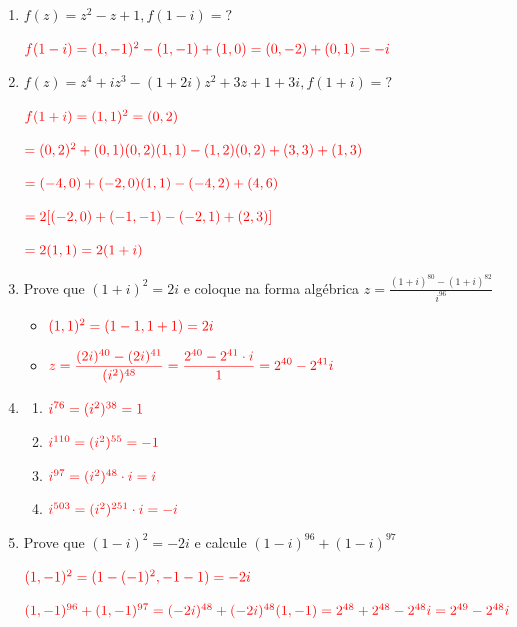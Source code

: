 \documentclass[12pt, openright, a4paper, twoside, english, brazil]{article}
\newenvironment{qitem}{
  \color{black}
\item}{\vspace{10pt}}
\newenvironment{qmitem}{
  \color{black}
\item
\begin{enumerate}[\bfseries a)]}{
\end{enumerate}\vspace{10pt}}
\begin{document}
\begin{enumerate}[\bfseries 1.]
  \begin{qitem} %
    $f(z) = z^2 - z + 1, f(1-i) = ?$

    $\color{red}f(1-i)= (1,-1)^2 - (1,-1) + (1,0) = (0,-2) + (0,1) = -i$
  \end{qitem}

  \begin{qitem} %
    $f(z) = z^4 + iz^3 - (1+2i)z^2 + 3z + 1 + 3i, f(1+i) = ?$

    $\color{red}f(1+i)=(1,1)^2 = (0,2)$

    $\color{red}= (0,2)^2 + (0,1)(0,2)(1,1) - (1,2)(0,2) + (3,3) + (1,3)$

    $\color{red}= (-4,0) + (-2,0)(1,1) - (-4,2) + (4,6)$

    $\color{red}= 2[(-2,0) + (-1,-1) - (-2,1) + (2,3)]$

    $\color{red}= 2(1,1) = 2(1+i)$
  \end{qitem}

  \begin{qitem} %
    Prove que $(1+i)^2 = 2i$ e coloque na forma algébrica $\displaystyle z =
    \frac{(1+i)^{80} - (1+i)^{82}}{i^{96}}$

    \begin{itemize}
      \item[1.] $\color{red} (1,1)^2 = (1-1, 1+1) = 2i$
      \item[2.] $\displaystyle \color{red} z = \frac{(2i)^{40} -
        (2i)^{41}}{(i^2)^{48}} =
        \frac{2^{40} - 2^{41} \cdot i}{1} = 2^{40} - 2^{41}i$
    \end{itemize}
  \end{qitem}

  \begin{qmitem} %
  \item $\color{red} i^{76} = (i^2)^{38} = 1$
  \item $\color{red} i^{110} = (i^2)^{55} = -1$
  \item $\color{red} i^{97} = (i^2)^{48} \cdot i = i$
  \item $\color{red} i^{503} = (i^2)^{251} \cdot i = -i$
  \end{qmitem}

  \begin{qitem} %
    Prove que $(1-i)^2 = -2i$ e calcule $(1-i)^{96} + (1-i)^{97}$

    $\color{red} (1,-1)^2 = (1-(-1)^2, -1-1) = -2i$

    $\color{red} (1,-1)^{96} + (1,-1)^{97} = (-2i)^{48} +
    (-2i)^{48}(1,-1) = 2^{48} + 2^{48} - 2^{48}i = 2^{49} - 2^{48}i$
  \end{qitem}


\end{enumerate}
\end{document}
